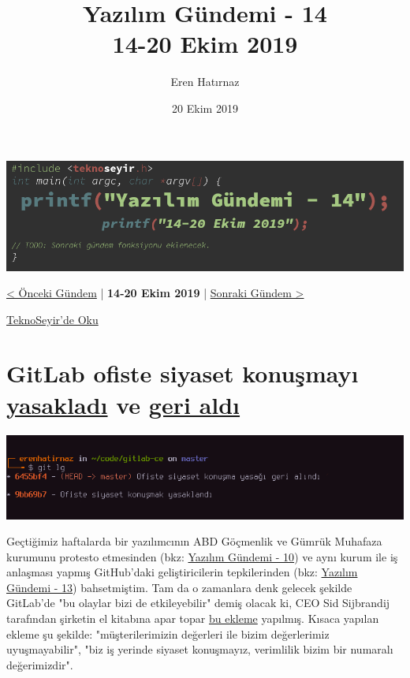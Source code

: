 \documentclass[11pt]{article}
\author{Eren Hatırnaz}
\date{20 Ekim 2019}
\title{Yazılım Gündemi - 14\\\medskip
\large 14-20 Ekim 2019}
\begin{document}
\maketitle
\tableofcontents \clearpage\shorthandoff{=}

\begin{center}
\includegraphics[width=.9\linewidth]{gorseller/yazilim-gundemi-banner.png}
\end{center}

\begin{center}
\href{../13/yazilim-gundemi-13.pdf}{< Önceki Gündem} | \textbf{14-20 Ekim 2019} | \href{../15/yazilim-gundemi-15.pdf}{Sonraki Gündem >}

\href{https://teknoseyir.com/blog/yazilim-gundemi-14-14-20-ekim-2019}{TeknoSeyir'de Oku}
\end{center}

\section{GitLab ofiste siyaset konuşmayı \href{https://www.theregister.co.uk/2019/10/16/gitlab\_employees\_gagged/}{yasakladı} ve \href{https://www.theregister.co.uk/2019/10/17/gitlab\_reverse\_ferret/}{geri aldı}}
\label{sec:orgd23c1ed}
\begin{center}
\includegraphics[width=.9\linewidth]{gorseller/gitlab-yasak.png}
\end{center}

Geçtiğimiz haftalarda bir yazılımcının ABD Göçmenlik ve Gümrük Muhafaza
kurumunu protesto etmesinden (bkz: \href{../10/yazilim-gundemi-10.pdf}{Yazılım Gündemi - 10}) ve aynı kurum ile iş
anlaşması yapmış GitHub'daki geliştiricilerin tepkilerinden (bkz: \href{../13/yazilim-gundemi-13.pdf}{Yazılım
Gündemi - 13}) bahsetmiştim. Tam da o zamanlara denk gelecek şekilde GitLab'de
"bu olaylar bizi de etkileyebilir" demiş olacak ki, CEO Sid Sijbrandij
tarafından şirketin el kitabına apar topar \href{https://gitlab.com/gitlab-com/www-gitlab-com/commit/b5a35716deb4f63299a23a40510475f5503c11c4}{bu ekleme} yapılmış. Kısaca yapılan
ekleme şu şekilde: "müşterilerimizin değerleri ile bizim değerlerimiz
uyuşmayabilir", "biz iş yerinde siyaset konuşmayız, verimlilik bizim bir
numaralı değerimizdir".
\end{document}
